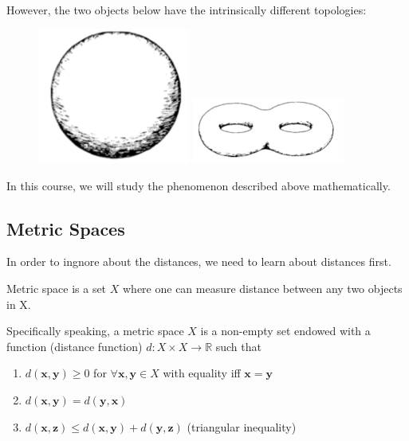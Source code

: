 However, the two objects below have the intrinsically different topologies:
 \begin{figure}[H]
\centering
\includegraphics[width=5cm]{week1/f_2_5}
\includegraphics[width=5cm]{week1/f_2_6}
\end{figure}
In this course, we will study the phenomenon described above mathematically.

\subsection{Metric Spaces}
In order to ingnore about the distances, we need to learn about distances first.
\begin{definition}
Metric space is a set $X$ where one can measure distance between any two objects in X.

Specifically speaking, a metric space $X$ is a non-empty set endowed with a function (distance function) $d:X\times X\to\mathbb{R}$ such that
\begin{enumerate}
\item
$d(\bm x,\bm y)\ge0$ for $\forall\bm x,\bm y\in X$ with equality iff $\bm x=\bm y$
\item
$d(\bm x,\bm y)=d(\bm y,\bm x)$
\item
$d(\bm x,\bm z)\le d(\bm x,\bm y)+d(\bm y,\bm z)$ (triangular inequality)
\end{enumerate}
\end{definition}

